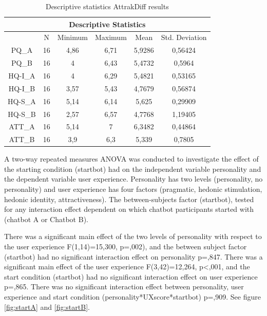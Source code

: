 \begin{table}[h]
\centering
\begin{tabular}{cccccc}
\hline
\multicolumn{6}{c}{\textbf{Descriptive Statistics}} \\
\hline
& N & Minimum & Maximum & Mean & Std. Deviation \\
PQ_A & 16 & 4,86 & 6,71 & 5,9286 & 0,56424 \\
PQ_B & 16 & 4 & 6,43 & 5,4732 & 0,5964 \\
HQ-I_A & 16 & 4 & 6,29 & 5,4821 & 0,53165 \\
HQ-I_B & 16 & 3,57 & 5,43 & 4,7679 & 0,56874 \\
HQ-S_A & 16 & 5,14 & 6,14 & 5,625 & 0,29909 \\
HQ-S_B & 16 & 2,57 & 6,57 & 4,7768 & 1,19405 \\
ATT_A & 16 & 5,14 & 7 & 6,3482 & 0,44864 \\
ATT_B & 16 & 3,9 & 6,3 & 5,339 & 0,7805 \\
\end{tabular}
\caption{Descriptive statistics AttrakDiff results}
 \label{table:6}
    \end{table}

A two-way repeated measures ANOVA was conducted to investigate the effect of the starting condition (startbot) had on the independent variable personality and the dependent variable user experience. Personality has two levels (personality, no personality) and user experience has four factors (pragmatic, hedonic stimulation, hedonic identity, attractiveness). The between-subjects factor (startbot), tested for any interaction effect dependent on which chatbot participants started with (chatbot A or Chatbot B).

There was a significant main effect of the two levels of personality with respect to the user experience F(1,14)=15,300, p=,002), and the between subject factor (startbot) had no significant interaction effect on personality p=,847. There was a significant main effect of the user experience F(3,42)=12,264, p<,001, and the start condition (startbot) had no significant interaction effect on user experience p=,865. There was no significant interaction effect between personality, user experience and start condition (personality*UXscore*startbot) p=,909. See figure \ref{fig:startA} and \ref{fig:startB}.


